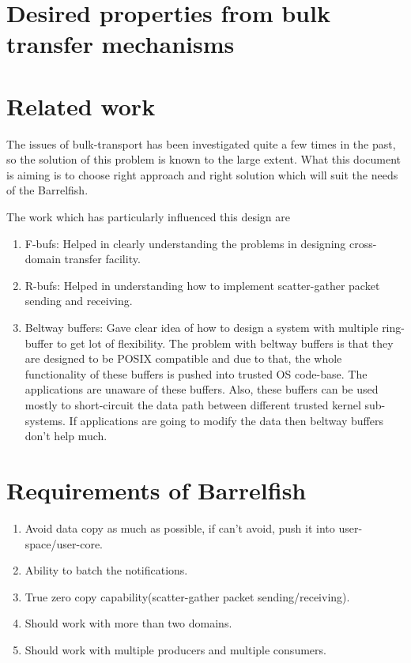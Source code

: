 \documentclass[a4paper,twoside]{report} %
\begin{document}
\section{Desired properties from bulk transfer mechanisms}

\section{Related work}
The issues of bulk-transport has been investigated quite a few times
in the past, so the solution of this problem is known to the large
extent.  What this document is aiming is to choose right approach and
right solution which will suit the needs of the Barrelfish.


The work which has particularly influenced this design are
\begin{enumerate}
  \item F-bufs: Helped in clearly understanding the problems in
  designing cross-domain transfer facility.
  \item R-bufs: Helped in understanding how to implement
  scatter-gather packet sending and receiving.
  \item Beltway buffers: Gave clear idea of how to design a
  system with multiple ring-buffer to get lot of flexibility.
  The problem with beltway buffers is that they are
  designed to be POSIX compatible and due to that, the whole
  functionality of these buffers is pushed into trusted OS code-base.
  The applications are unaware of these buffers.  Also, these buffers
  can be used mostly to short-circuit the data path between different
  trusted kernel sub-systems.  If applications are going to modify the
  data then beltway buffers don't help much.
\end{enumerate}

\section{Requirements of Barrelfish}

\begin{enumerate}
  \item Avoid data copy as much as possible, if can't avoid,
  push it into user-space/user-core.
  \item Ability to batch the notifications.
  \item True zero copy capability(scatter-gather packet
  sending/receiving).
  \item Should work with more than two domains.
  \item Should work with multiple producers and multiple consumers.
\end{enumerate}
\end{document}
